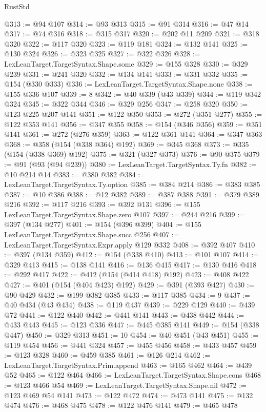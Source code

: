 \begin{lexlean}{RustStd}
\begin{coremodule}
@313 := @94 @107
@314 := @93 @313
@315 := @91 @314
@316 := @47 @14
@317 := @74 @316
@318 := @315 @317
@320 := @202 @11 @209
@321 := @318 @320
@322 := @117 @320
@323 := @119 @181
@324 := @132 @141
@325 := @130 @324
@326 := @323 @325
@327 := @322 @326
@328 := LexLeanTarget.TargetSyntax.Shape.some
@329 := @155 @328
@330 := @329 @239
@331 := @241 @320
@332 := @134 @141
@333 := @331 @332
@335 := @154 (@330 @333)
@336 := LexLeanTarget.TargetSyntax.Shape.none
@338 := @155 @336 @107
@339 := 8
@342 := @40 @339 (@43 @339)
@344 := @119 @342 @324
@345 := @322 @344
@346 := @329 @256
@347 := @258 @320
@350 := @123 @225 @207 @141
@351 := @122 @350
@353 := @272 (@351 @277)
@355 := @122 @353 @141
@356 := @347 @355
@358 := @154 (@346 @356)
@359 := @351 @141
@361 := @272 (@276 @359)
@363 := @122 @361 @141
@364 := @347 @363
@368 := @358 (@154 (@338 @364) @192)
@369 := @345 @368
@373 := @335 (@154 (@338 @369) @192)
@375 := @321 (@327 @373)
@376 := @90 @375
@379 := @91 (@93 (@94 @239))
@380 := LexLeanTarget.TargetSyntax.Ty.fn
@382 := @10 @214 @14
@383 := @380 @382
@384 := LexLeanTarget.TargetSyntax.Ty.option
@385 := @384 @214
@386 := @383 @385
@387 := @10 @386
@388 := @12 @382
@389 := @387 @388
@391 := @379 @389 @216
@392 := @117 @216
@393 := @392 @131
@396 := @155 LexLeanTarget.TargetSyntax.Shape.zero @107
@397 := @244 @216
@399 := @397 (@134 @277)
@401 := @154 (@396 @399)
@404 := @155 LexLeanTarget.TargetSyntax.Shape.succ @256
@407 := LexLeanTarget.TargetSyntax.Expr.apply @129 @332
@408 := @392 @407
@410 := @397 (@134 @359)
@412 := @154 (@338 @410)
@413 := @101 @107
@414 := @329 @413
@415 := @138 @141
@416 := @136 @415
@417 := @130 @416
@418 := @292 @417
@422 := @412 (@154 (@414 @418) @192)
@423 := @408 @422
@427 := @401 (@154 (@404 @423) @192)
@429 := @391 (@393 @427)
@430 := @90 @429
@432 := @199 @382 @385
@433 := @117 @385
@434 := 9
@437 := @40 @434 (@43 @434)
@438 := @119 @437
@439 := @229 @129
@440 := @439 @72
@441 := @122 @440
@442 := @441 @141
@443 := @438 @442
@444 := @433 @443
@445 := @123 @336
@447 := @445 @385 @141
@449 := @154 (@338 @447)
@450 := @329 @313
@451 := 10
@454 := @40 @451 (@43 @451)
@455 := @119 @454
@456 := @441 @324
@457 := @455 @456
@458 := @433 @457
@459 := @123 @328
@460 := @459 @385
@461 := @126 @214
@462 := LexLeanTarget.TargetSyntax.Prim.append
@463 := @165 @462
@464 := @439 @52
@465 := @122 @464
@466 := LexLeanTarget.TargetSyntax.Shape.cons
@468 := @123 @466 @54
@469 := LexLeanTarget.TargetSyntax.Shape.nil
@472 := @123 @469 @54 @141
@473 := @122 @472
@474 := @473 @141
@475 := @132 @474
@476 := @468 @475
@478 := @122 @476 @141
@479 := @465 @478

\end{coremodule}
\end{lexlean}
